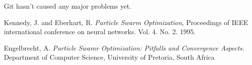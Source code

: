\documentclass[twoside]{article}
\begin{document}
\begin{multicols}{2}
Git hasn't caused any major problems yet.



\begin{thebibliography}{99} %

 Kennedy, J. and Eberhart, R.
  \emph{Particle Swarm Optimization},
 Proceedings of IEEE international conference on neural networks. Vol. 4. No. 2. 1995. 
 
 Engelbrecht, A. \emph{Particle Swamr Optimization: Pitfalls and Convergence Aspects.}
 Department of Computer Science, University of Pretoria, South Africa
 
 
\end{thebibliography}


\end{multicols}
\end{document}
